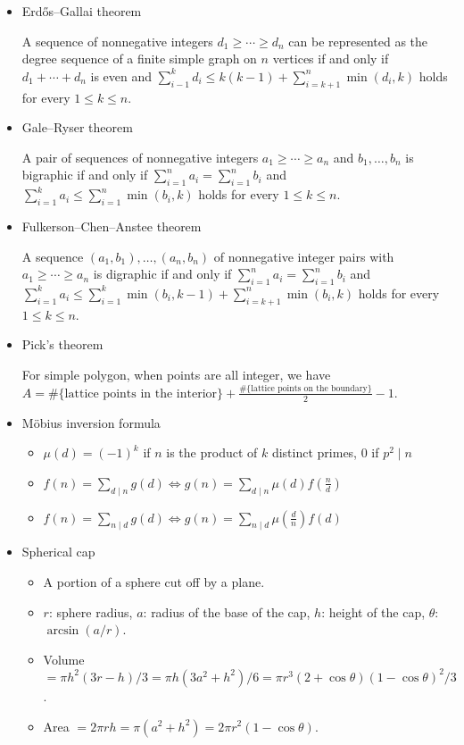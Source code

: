 \begin{itemize}
\item Erdős–Gallai theorem 

A sequence of nonnegative integers $d_1\ge\cdots\ge d_n$ can be represented as the degree sequence of a finite simple graph on $n$ vertices if and only if $d_1+\cdots+d_n$ is even and $\displaystyle\sum_{i-1}^kd_i\le k(k-1)+\displaystyle\sum_{i=k+1}^n\min(d_i,k)$ holds for every $1\le k\le n$.

\item Gale–Ryser theorem

A pair of sequences of nonnegative integers $a_1\ge\cdots\ge a_n$ and $b_1,\ldots,b_n$ is bigraphic if and only if $\displaystyle\sum_{i=1}^n a_i=\displaystyle\sum_{i=1}^n b_i$ and $\displaystyle\sum_{i=1}^k a_i\le \displaystyle\sum_{i=1}^n\min(b_i,k)$ holds for every $1\le k\le n$.

\item Fulkerson–Chen–Anstee theorem

A sequence $(a_1,b_1),\ldots,(a_n,b_n)$ of nonnegative integer pairs with $a_1\ge\cdots\ge a_n$ is digraphic if and only if $\displaystyle\sum_{i=1}^n a_i=\displaystyle\sum_{i=1}^n b_i$ and $\displaystyle\sum_{i=1}^k a_i\le \displaystyle\sum_{i=1}^k\min(b_i,k-1)+\displaystyle\sum_{i=k+1}^n\min(b_i,k)$ holds for every $1\le k\le n$.

\item Pick's theorem

For simple polygon, when points are all integer, we have \\$A=\text{\#\{lattice points in the interior\}} + \frac{\text{\#\{lattice points on the boundary\}}}{2} - 1$.

\item Möbius inversion formula

\begin{itemize}
  \item $\mu(d)=(-1)^k$ if $n$ is the product of $k$ distinct primes, $0$ if $p^2 \mid n$
  \item $f(n)=\sum_{d\mid n}g(d)\Leftrightarrow g(n)=\sum_{d\mid n}\mu(d)f(\frac{n}{d})$
  \item $f(n)=\sum_{n\mid d}g(d)\Leftrightarrow g(n)=\sum_{n\mid d}\mu(\frac{d}{n})f(d)$
\end{itemize}

\item Spherical cap

\begin{itemize}
  \item A portion of a sphere cut off by a plane.
  \item $r$: sphere radius, $a$: radius of the base of the cap, $h$: height of the cap, $\theta$: $\arcsin(a/r)$.
  \item Volume $=\pi h^2(3r-h)/3=\pi h(3a^2+h^2)/6=\pi r^3(2+\cos\theta)(1-\cos\theta)^2/3$.
  \item Area $=2\pi rh=\pi(a^2+h^2)=2\pi r^2(1-\cos\theta)$.
\end{itemize}


\end{itemize}
